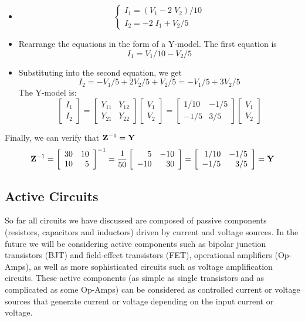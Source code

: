 \begin{itemize}
\begin{itemize}
\item
\[	\left\{ \begin{array}{l} 
	I_1=(V_1-2\;V_2)/10 \\ I_2=-2\;I_1+V_2/5 \end{array} \right. \]
\item Rearrange the equations in the form of a Y-model. The first equation is
\[	I_1=V_1/10-V_2/5	\]
\item Substituting into the second equation, we get
\[	I_2=-V_1/5+2V_2/5+V_2/5=-V_1/5+3V_2/5	\]
The Y-model is:
\[	\left[ \begin{array}{l} I_1 \\ I_2 \end{array} \right]=
	\left[ \begin{array}{rr} Y_{11} & Y_{12} \\ Y_{21} & Y_{22} \end{array} \right]
	\left[ \begin{array}{l} V_1 \\ V_2 \end{array} \right]
=	\left[ \begin{array}{rr} 1/10 & -1/5 \\ -1/5 & 3/5 \end{array} \right]
	\left[ \begin{array}{l} V_1 \\ V_2 \end{array} \right] \]
\end{itemize}
Finally, we can verify that ${\bf Z}^{-1}={\bf Y}$
\[ {\bf Z}^{-1}=\left[ \begin{array}{rr} 30 & 10 \\ 10 & 5 \end{array} \right]^{-1}
	=\frac{1}{50}\left[ \begin{array}{rr} 5 & -10 \\ -10 & 30 \end{array} \right]
	=\left[ \begin{array}{rr} 1/10 & -1/5 \\ -1/5 & 3/5 \end{array} \right]
	={\bf Y}	\]

\subsection*{Active Circuits}

So far all circuits we have discussed are composed of passive components 
(resistors, capacitors and inductors) driven by current and voltage sources.
In the future we will be considering active components such as bipolar
junction transistors (BJT) and field-effect transistors (FET), operational
amplifiers (Op-Amps), as well as more sophisticated circuits such as voltage 
amplification circuits. These active components (as simple as single transistors
and as complicated as some Op-Amps) can be considered as controlled current or 
voltage sources that generate current or voltage depending on the input current
or voltage.


\end{itemize}
